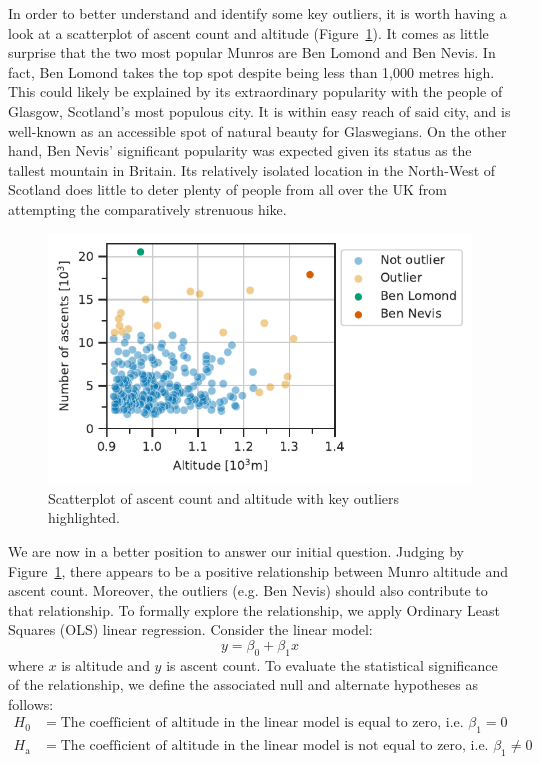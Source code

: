 \documentclass[11pt,a4paper]{article}
\begin{document}
In order to better understand and identify some key outliers, it is worth having a look at a scatterplot of ascent count and altitude (Figure~\ref{fds-project-template:fig:scatterplot}). It comes as little surprise that the two most popular Munros are Ben Lomond and Ben Nevis. In fact, Ben Lomond takes the top spot despite being less than 1,000 metres high. This could likely be explained by its extraordinary popularity with the people of Glasgow, Scotland's most populous city. It is within easy reach of said city, and is well-known as an accessible spot of natural beauty for Glaswegians. On the other hand, Ben Nevis' significant popularity was expected given its status as the tallest mountain in Britain. Its relatively isolated location in the North-West of Scotland does little to deter plenty of people from all over the UK from attempting the comparatively strenuous hike.
\begin{figure} [h!]
  \centering
  \includegraphics{report/scatterplot.pdf}
  \caption{Scatterplot of ascent count and altitude with key outliers highlighted.}
  \label{fds-project-template:fig:scatterplot}
\end{figure}

We are now in a better position to answer our initial question. Judging by Figure~\ref{fds-project-template:fig:scatterplot}, there appears to be a positive relationship between Munro altitude and ascent count. Moreover, the outliers (e.g. Ben Nevis) should also contribute to that relationship. To formally explore the relationship, we apply Ordinary Least Squares (OLS) linear regression. Consider the linear model: 
$$y=\beta_0 + \beta_1 x$$
where $x$ is altitude and $y$ is ascent count. To evaluate the statistical significance of the relationship, we define the associated null and alternate hypotheses as follows:
\begin{align*}
    H_0 &= \text{The coefficient of altitude in the linear model is equal to zero, i.e. $\beta_1=0$}\\
    H_\text{a} &= \text{The coefficient of altitude in the linear model is not equal to zero, i.e. $\beta_1\neq0$}
\end{align*}
\end{document}
